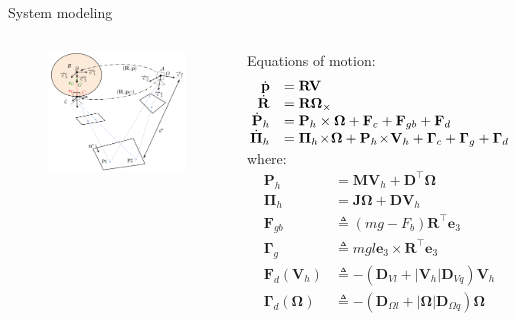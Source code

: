 \documentclass{beamer}
\begin{document}
\begin{frame}{System modeling}
	\begin{columns}
		\begin{figure}
			\includegraphics[width = 55mm]{Images/Notation.png}
		\end{figure}
		\begin{block}{Equations of motion:}
			\scriptsize
			\begin{equation*}\label{eq:system2}
			\begin{array}{rl}
			\dot{\mathbf{p}} & =  \mathbf{R} \mathbf{V} \\
			\dot{\mathbf{R}} & =  \mathbf{R} \mathbf{\Omega}_\times \\
			\!\!\dot{\mathbf{P}}_h &= \mathbf{P}_h \times \mathbf{\Omega} +\mathbf{F}_c + \mathbf{F}_{gb} + \mathbf{F}_d  \\
			\!\!\dot{\mathbf{\Pi}}_h &=  \mathbf{\Pi}_h \!\times\! \mathbf{\mathbf{\Omega}} + \mathbf{P}_h \!\times \!\mathbf{V}_h  +\mathbf{\Gamma}_c + \mathbf{\Gamma}_g + \mathbf{\Gamma}_d \!\!\vspace{-0.2cm}
			\end{array}
			\end{equation*} \vspace{-0.3cm}
			where: \\
			\begin{equation*}
			\begin{array}{rl}
			\mathbf{P}_h & = \mathbf{M}\mathbf{V}_h + \mathbf{D}^{\!\top} \mathbf{\Omega}\\[1ex]
			\mathbf{\Pi}_h & = \mathbf{J} \mathbf{\Omega} + \mathbf{D}\mathbf{V}_h \\
			\mathbf{F}_{gb}  &\triangleq (m g - F_b) \mathbf{R}^{\!\top} \mathbf{e}_3\\
			\mathbf{\Gamma}_g  &\triangleq mgl\mathbf{e}_{3}\! \times \!\mathbf{R}^{\!\top} \mathbf{e}_3\\
			\mathbf{F}_d(\mathbf{V}_h) & \triangleq - (\mathbf{D}_{V\!l}   +|\mathbf{V}_h|\mathbf{D}_{V\!q} )\mathbf{V}_h  \\
			\mathbf{\Gamma}_d(\mathbf{\Omega})& \triangleq  - (\mathbf{D}_{\Omega l}  + |\mathbf{\Omega}|\mathbf{D}_{\Omega q} )\mathbf{\Omega}
			\end{array}
			\end{equation*}
		\end{block}
	\end{columns}

\end{frame}
\end{document}
